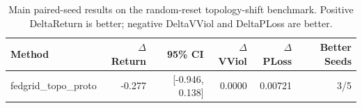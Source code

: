 \begin{table}[t]
\centering
\small
\begin{tabular}{lrrrrr}
\hline
Method & $\Delta$Return & 95\% CI & $\Delta$VViol & $\Delta$PLoss & Better Seeds \\
\hline
[case=141, k=6, policy=, radius=] fedgrid\_topo\_proto & -0.277 & [-0.946, 0.138] & 0.0000 & 0.00721 & 3/5 \\
\hline
\end{tabular}
\caption{Main paired-seed results on the random-reset topology-shift benchmark. Positive DeltaReturn is better; negative DeltaVViol and DeltaPLoss are better.}
\label{tab:fedgrid-main-random-reset}
\end{table}
